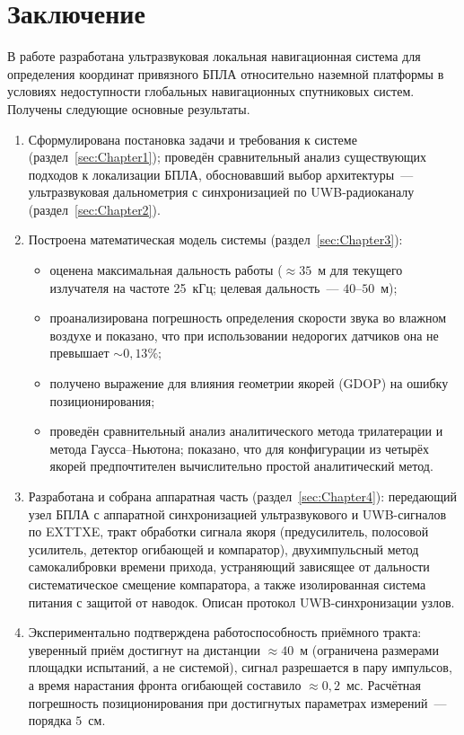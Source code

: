 \section{Заключение}
\label{sec:Chapter5}

В работе разработана ультразвуковая локальная навигационная система для
определения координат привязного БПЛА относительно наземной платформы в условиях
недоступности глобальных навигационных спутниковых систем. Получены следующие
основные результаты.

\begin{enumerate}
  \item Сформулирована постановка задачи и требования к системе
        (раздел~\ref{sec:Chapter1}); проведён сравнительный анализ существующих
        подходов к локализации БПЛА, обосновавший выбор архитектуры~--- ультразвуковая
        дальнометрия с синхронизацией по UWB-радиоканалу (раздел~\ref{sec:Chapter2}).

  \item Построена математическая модель системы (раздел~\ref{sec:Chapter3}):
        \begin{itemize}
          \item оценена максимальная дальность работы (${\approx}35$~м для текущего
                излучателя на частоте 25~кГц; целевая дальность~--- $40$--$50$~м);
          \item проанализирована погрешность определения скорости звука во влажном
                воздухе и показано, что при использовании недорогих датчиков она не
                превышает ${\sim}0{,}13\%$;
          \item получено выражение для влияния геометрии якорей (GDOP) на ошибку
                позиционирования;
          \item проведён сравнительный анализ аналитического метода трилатерации и
                метода Гаусса--Ньютона; показано, что для конфигурации из четырёх
                якорей предпочтителен вычислительно простой аналитический метод.
        \end{itemize}

  \item Разработана и собрана аппаратная часть (раздел~\ref{sec:Chapter4}):
        передающий узел БПЛА с аппаратной синхронизацией ультразвукового и
        UWB-сигналов по EXTTXE, тракт обработки сигнала якоря (предусилитель,
        полосовой усилитель, детектор огибающей и компаратор), двухимпульсный метод
        самокалибровки времени прихода, устраняющий зависящее от дальности
        систематическое смещение компаратора, а также изолированная система питания
        с защитой от наводок. Описан протокол UWB-синхронизации узлов.

  \item Экспериментально подтверждена работоспособность приёмного тракта: уверенный
        приём достигнут на дистанции ${\approx}40$~м (ограничена размерами площадки
        испытаний, а не системой), сигнал разрешается в пару импульсов, а время
        нарастания фронта огибающей составило ${\approx}0{,}2$~мс. Расчётная погрешность
        позиционирования при достигнутых параметрах измерений~--- порядка $5$~см.
\end{enumerate}


